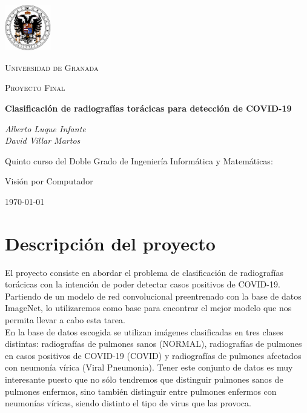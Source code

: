 \documentclass[11pt,a4paper]{article}
\theoremstyle{definition}
\begin{document}
\begin{titlepage}
  \centering
 \includegraphics[width=0.15\textwidth]{./images/exp.jpg}\par\vspace{1cm}
  {\scshape\LARGE Universidad de Granada  \par}
  \vspace{1cm}
  {\scshape Proyecto Final\par}
  \vspace{1.5cm}
  {\huge\bfseries  Clasificación de radiografías torácicas para detección de COVID-19\par}
  \vspace{2cm}
  {\Large\itshape Alberto Luque Infante\\David Villar Martos\par}
  \vfill
  Quinto curso del Doble Grado de Ingeniería Informática y Matemáticas:\par
  Visión por Computador

  \vfill

  {\large \today\par}
\end{titlepage}

\tableofcontents
\newpage
\section{Descripción del proyecto}

El proyecto consiste en abordar el problema de clasificación de radiografías torácicas con la intención de poder detectar casos positivos de COVID-19.\\

Partiendo de un modelo de red convolucional preentrenado con la base de datos ImageNet, lo utilizaremos como base para encontrar el mejor modelo que nos permita llevar a cabo esta tarea.\\

En la base de datos escogida se utilizan imágenes clasificadas en tres clases distintas: radiografías de pulmones sanos (NORMAL), radiografías de pulmones en casos positivos de COVID-19 (COVID) y radiografías de pulmones afectados con neumonía vírica (Viral Pneumonia). Tener este conjunto de datos es muy interesante puesto que no sólo tendremos que distinguir pulmones sanos de pulmones enfermos, sino también distinguir entre pulmones enfermos con neumonías víricas,  siendo distinto el tipo de virus que las provoca.\\
\end{document}
